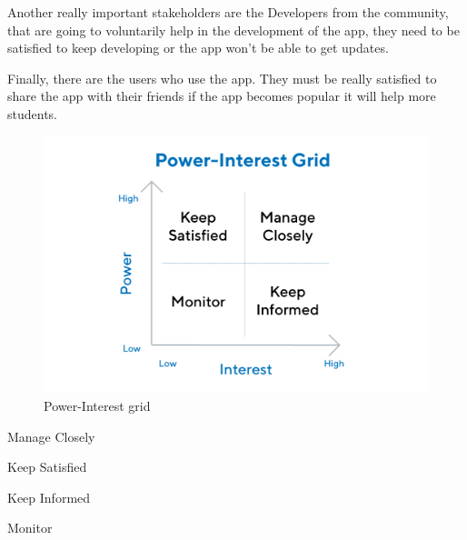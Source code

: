 Another really important stakeholders are the Developers from the community, that are going to voluntarily help in the development of the app, they need to be satisfied to keep developing or the app won't be able to get updates.

Finally, there are the users who use the app. They must be really satisfied to share the app with their friends if the app becomes popular it will help more students.

\begin{figure}[ht!]
    \centercenter
    \includegraphics[width=1\columnwidth]{media/power-interest-grid.png}
    \caption[Power-Interest grid]{Power-Interest grid \cite{stakeholder-analysis}}
    \label{power-interest_grid}
\end{figure}

\pagebreak
\begin{framed}
\begin{multicols}{4}
\noindent
\tikzcircle[fill=Green]{6pt} Manage Closely

\noindent
\tikzcircle[fill=Cyan]{6pt} Keep Satisfied

\noindent
\tikzcircle[fill=Goldenrod]{6pt} Keep Informed

\noindent
\tikzcircle[fill=Magenta]{6pt} Monitor
\end{multicols}
\end{framed}

